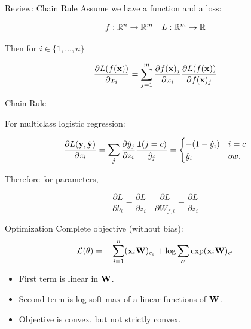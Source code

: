 \documentclass{beamer}
\begin{document}
\begin{frame}{Review: Chain Rule}
  Assume we have a function and a loss:

  \[ f : \reals^n \rightarrow \reals^m \ \ \  L : \reals^m \rightarrow \reals \] 

  Then for $i \in \{1, \ldots, n \}$

  \[ \frac{\partial L(f(\mathbf{x}))}{\partial x_i} = \sum_{j =1}^m \frac{\partial f(\mathbf{x})_j} {\partial  x_i} \frac{\partial L(f(\mathbf{x}))} {\partial f(\mathbf{x})_j}   \]

  
\end{frame}

\begin{frame}{Chain Rule}
  
  For multiclass logistic regression:
  
  \[ \frac{\partial L(\mathbf{y}, \hat{\mathbf{y}})}{\partial z_i} = \sum_{j} \frac{\partial \hat{y}_j }{\partial z_i}  \frac{\mathbf{1}(j = c)} {\hat{y}_j} =     \begin{cases}
      -(1 - \hat{y}_i) & i = c\\
      \hat{y}_i & ow. \\
    \end{cases} \] 

  Therefore for parameters, 

  \[\frac{\partial L}{\partial b_{i}} = 
    \frac{\partial L}{\partial z_{i}} \ \ \ \ \frac{\partial L}{\partial W_{f, i}} = 
     \frac{\partial L}{\partial z_{i}}\]
\end{frame}


\begin{frame}{Optimization}
  Complete objective (without bias):
  \[ \mathcal{L}(\theta) =  - \sum_{i=1}^n (\mathbf{x}_i \mathbf{W} )_{c_i}  + \log \sum_{c'} \exp  (\mathbf{x}_i \mathbf{W}  )_{c'} \] 
  \begin{itemize}
  \item First term is linear in $\mathbf{W}$. 
  \item Second term is log-soft-max of a linear functions of $\mathbf{W}$.
  \item Objective is convex, but not strictly convex.
  \end{itemize}
\end{frame}
\end{document}
